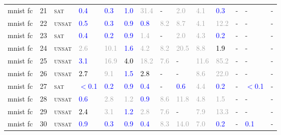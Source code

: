 \begin{center}
{\begin{longtable}{@{}llllllllllllll@{}}
mnist fc & 21 & \textsc{sat} & \textcolor{blue}{0.4} & \textcolor{blue}{0.3} & \textcolor{blue}{1.0} & \textcolor{darkgray}{31.4} & - & \textcolor{darkgray}{2.0} & \textcolor{darkgray}{4.1} & \textcolor{blue}{0.3} & - & - & - \\
mnist fc & 22 & \textsc{unsat} & \textcolor{blue}{0.5} & \textcolor{blue}{0.3} & \textcolor{blue}{0.9} & \textcolor{blue}{0.8} & \textcolor{darkgray}{8.2} & \textcolor{darkgray}{8.7} & \textcolor{darkgray}{4.1} & \textcolor{darkgray}{12.2} & - & - & - \\
mnist fc & 23 & \textsc{sat} & \textcolor{blue}{0.4} & \textcolor{blue}{0.2} & \textcolor{blue}{0.9} & \textcolor{darkgray}{1.4} & - & \textcolor{darkgray}{2.0} & \textcolor{darkgray}{4.3} & \textcolor{blue}{0.2} & - & - & - \\
mnist fc & 24 & \textsc{unsat} & \textcolor{darkgray}{2.6} & \textcolor{darkgray}{10.1} & \textcolor{blue}{1.6} & \textcolor{darkgray}{4.2} & \textcolor{darkgray}{8.2} & \textcolor{darkgray}{20.5} & \textcolor{darkgray}{8.8} & \textcolor{black}{1.9} & - & - & - \\
mnist fc & 25 & \textsc{unsat} & \textcolor{blue}{3.1} & \textcolor{darkgray}{16.9} & \textcolor{black}{4.0} & \textcolor{darkgray}{18.2} & \textcolor{darkgray}{7.6} & - & \textcolor{darkgray}{11.6} & \textcolor{darkgray}{85.2} & - & - & - \\
mnist fc & 26 & \textsc{unsat} & \textcolor{black}{2.7} & \textcolor{darkgray}{9.1} & \textcolor{blue}{1.5} & \textcolor{black}{2.8} & - & - & \textcolor{darkgray}{8.6} & \textcolor{darkgray}{22.0} & - & - & - \\
mnist fc & 27 & \textsc{sat} & \textcolor{blue}{$<$0.1} & \textcolor{blue}{0.2} & \textcolor{blue}{0.9} & \textcolor{blue}{0.4} & - & \textcolor{blue}{0.6} & \textcolor{darkgray}{4.4} & \textcolor{blue}{0.2} & - & \textcolor{blue}{$<$0.1} & - \\
mnist fc & 28 & \textsc{unsat} & \textcolor{blue}{0.6} & \textcolor{darkgray}{2.8} & \textcolor{darkgray}{1.2} & \textcolor{blue}{0.9} & \textcolor{darkgray}{8.6} & \textcolor{darkgray}{11.8} & \textcolor{darkgray}{4.8} & \textcolor{darkgray}{1.5} & - & - & - \\
mnist fc & 29 & \textsc{unsat} & \textcolor{black}{2.4} & \textcolor{darkgray}{3.1} & \textcolor{blue}{1.2} & \textcolor{darkgray}{2.8} & \textcolor{darkgray}{7.6} & - & \textcolor{darkgray}{7.9} & \textcolor{darkgray}{13.3} & - & - & - \\
mnist fc & 30 & \textsc{unsat} & \textcolor{blue}{0.9} & \textcolor{blue}{0.3} & \textcolor{blue}{0.9} & \textcolor{blue}{0.4} & \textcolor{darkgray}{8.3} & \textcolor{darkgray}{14.0} & \textcolor{darkgray}{7.0} & \textcolor{blue}{0.2} & - & \textcolor{blue}{0.1} & - \\

\end{longtable}}
\end{center}
